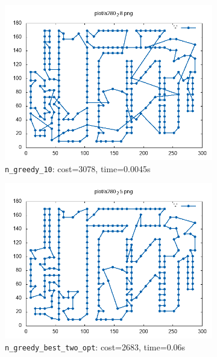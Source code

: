 \begin{figure}[!h]
	\begin{subfigure}{.5\columnwidth}
		\centering
		\includegraphics[width=\columnwidth]{../res/a280_28.png}
		\caption{\texttt{n\_greedy\_10}: cost=3078, time=0.0045s}
		\label{fig:a280_10}
	\end{subfigure}
	\begin{subfigure}{.5\columnwidth}
		\centering
		\includegraphics[width=\columnwidth]{../res/a280_25.png}
		\caption{\texttt{n\_greedy\_best\_two\_opt}: cost=2683, time=0.06s}
		\label{fig:a280_25}
	\end{subfigure}
	\begin{subfigure}{.5\columnwidth}
		\centering

\end{subfigure}
\end{figure}
